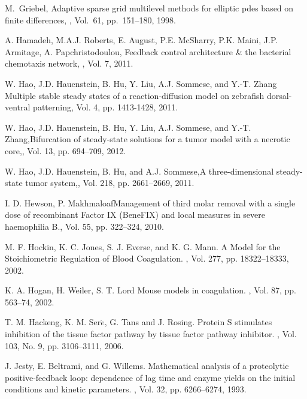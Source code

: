 \begin{thebibliography}{99}
\newblock M.~Griebel, \newblock Adaptive sparse grid multilevel methods for elliptic pdes based
\newblock   on finite differences, , Vol.~61,  pp.~151--180, 1998.

\newblock A. Hamadeh, M.A.J. Roberts, E. August, P.E. McSharry, P.K. Maini,
J.P. Armitage, \newblock A. Papchristodoulou, Feedback control
architecture \& the bacterial chemotaxis network, , Vol. 7, 2011.



 W. Hao, J.D. Hauenstein, B.
   Hu, Y. Liu, A.J.
   Sommese, and Y.-T. Zhang \newblock Multiple stable
   steady
   states of
   a reaction-diffusion model on zebrafish
   dorsal-ventral
   patterning, Vol. 4, pp. 1413-1428, 2011.

  W. Hao, J.D. Hauenstein, B.
   Hu, Y. Liu, A.J.
   Sommese, and Y.-T. Zhang,\newblock Bifurcation of
   steady-state solutions for a
tumor model with a necrotic core,, Vol. 13, pp. 694--709, 2012.

  W. Hao, J.D. Hauenstein, B.
   Hu, and A.J.
   Sommese,\newblock A three-dimensional steady-state
   tumor system,,
   Vol. 218, pp. 2661--2669, 2011.

I. D. Hewson, P. Makhmaloaf\newblock Management of third molar
removal with a single dose of recombinant Factor IX (BeneFIX) and
local measures in severe haemophilia B., Vol. 55, pp. 322--324, 2010.

 M. F. Hockin, K. C. Jones, S. J. Everse, and K. G. Mann.
\newblock A Model for the Stoichiometric Regulation of Blood
Coagulation.
, Vol. 277, pp. 18322--18333, 2002.

 K. A. Hogan, H. Weiler, S. T. Lord \newblock Mouse models in coagulation. , Vol. 87,  pp. 563--74, 2002.

 T. M. Hackeng, K. M. Ser$\acute{e}$, G. Tans and J. Rosing.
\newblock Protein S stimulates inhibition of the tissue factor pathway by tissue factor pathway inhibitor.
, Vol. 103, No. 9,  pp. 3106--3111, 2006.

J. Jesty, E. Beltrami, and G. Willems.
\newblock Mathematical analysis of a proteolytic positive-feedback loop: dependence
of lag time and enzyme yields on the initial conditions and kinetic
parameters.
, Vol. 32, pp. 6266--6274, 1993.


\end{thebibliography}
